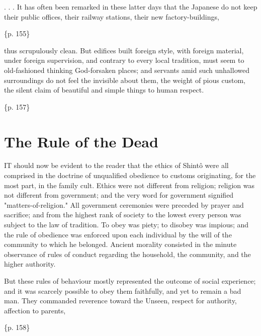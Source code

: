 . . . It has often been remarked in these latter days that the Japanese do not keep their public offices, their railway stations, their new factory-buildings,

\{p. 155\}

thus scrupulously clean. But edifices built foreign style, with foreign material, under foreign supervision, and contrary to every local tradition, must seem to old-fashioned thinking God-forsaken places; and servants amid such unhallowed surroundings do not feel the invisible about them, the weight of pious custom, the silent claim of beautiful and simple things to human respect.

\{p. 157\}

\section{The Rule of the Dead}
\label{sec:org31d5668}

IT should now be evident to the reader that the ethics of Shintô were all comprised in the doctrine of unqualified obedience to customs originating, for the most part, in the family cult. Ethics were not different from religion; religion was not different from government; and the very word for government signified "matters-of-religion." All government ceremonies were preceded by prayer and sacrifice; and from the highest rank of society to the lowest every person was subject to the law of tradition. To obey was piety; to disobey was impious; and the rule of obedience was enforced upon each individual by the will of the community to which he belonged. Ancient morality consisted in the minute observance of rules of conduct regarding the household, the community, and the higher authority.

But these rules of behaviour mostly represented the outcome of social experience; and it was scarcely possible to obey them faithfully, and yet to remain a bad man. They commanded reverence toward the Unseen, respect for authority, affection to parents,

\{p. 158\}

